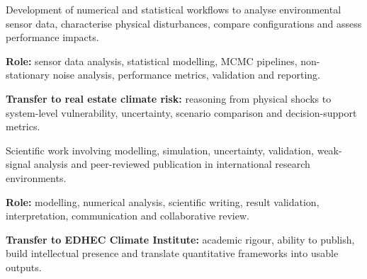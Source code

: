\documentclass[8pt,a4paper,ragged2e,withhyper]{altacv}
\begin{document}
Development of numerical and statistical workflows to analyse environmental sensor data, characterise physical disturbances, compare configurations and assess performance impacts.

\textbf{Role:} sensor data analysis, statistical modelling, MCMC pipelines, non-stationary noise analysis, performance metrics, validation and reporting.

\textbf{Transfer to real estate climate risk:} reasoning from physical shocks to system-level vulnerability, uncertainty, scenario comparison and decision-support metrics.

\divider


Scientific work involving modelling, simulation, uncertainty, validation, weak-signal analysis and peer-reviewed publication in international research environments.

\textbf{Role:} modelling, numerical analysis, scientific writing, result validation, interpretation, communication and collaborative review.

\textbf{Transfer to EDHEC Climate Institute:} academic rigour, ability to publish, build intellectual presence and translate quantitative frameworks into usable outputs.


\vspace{-.3cm}


{\small
{}
}

\divider\smallskip
\vspace{-.3cm}


{\small
{}
}
\end{document}
